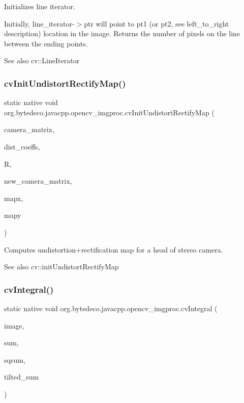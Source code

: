 Initializes line iterator. 

Initially, line\+\_\+iterator-\/$>$ptr will point to pt1 (or pt2, see left\+\_\+to\+\_\+right description) location in the image. Returns the number of pixels on the line between the ending points. \begin{DoxySeeAlso}{See also}
cv\+::\+Line\+Iterator 
\end{DoxySeeAlso}
\mbox{\label{group__imgproc__c_gab25847a22028fe0d1088d6572aca641a}} 
\subsubsection{\texorpdfstring{cv\+Init\+Undistort\+Rectify\+Map()}{cvInitUndistortRectifyMap()}}
{\footnotesize\ttfamily static native void org.\+bytedeco.\+javacpp.\+opencv\+\_\+imgproc.\+cv\+Init\+Undistort\+Rectify\+Map (\begin{DoxyParamCaption}\item[{@Const Cv\+Mat}]{camera\+\_\+matrix,  }\item[{@Const Cv\+Mat}]{dist\+\_\+coeffs,  }\item[{@Const Cv\+Mat}]{R,  }\item[{@Const Cv\+Mat}]{new\+\_\+camera\+\_\+matrix,  }\item[{Cv\+Arr}]{mapx,  }\item[{Cv\+Arr}]{mapy }\end{DoxyParamCaption})\hspace{0.3cm}{\ttfamily [static]}}



Computes undistortion+rectification map for a head of stereo camera. 

\begin{DoxySeeAlso}{See also}
cv\+::init\+Undistort\+Rectify\+Map 
\end{DoxySeeAlso}
\mbox{\label{group__imgproc__c_ga08246108002aef3cbe4402ee61232191}} 
\subsubsection{\texorpdfstring{cv\+Integral()}{cvIntegral()}}
{\footnotesize\ttfamily static native void org.\+bytedeco.\+javacpp.\+opencv\+\_\+imgproc.\+cv\+Integral (\begin{DoxyParamCaption}\item[{@Const Cv\+Arr}]{image,  }\item[{Cv\+Arr}]{sum,  }\item[{Cv\+Arr}]{sqsum,  }\item[{Cv\+Arr}]{tilted\+\_\+sum }\end{DoxyParamCaption})\hspace{0.3cm}{\ttfamily [static]}}



